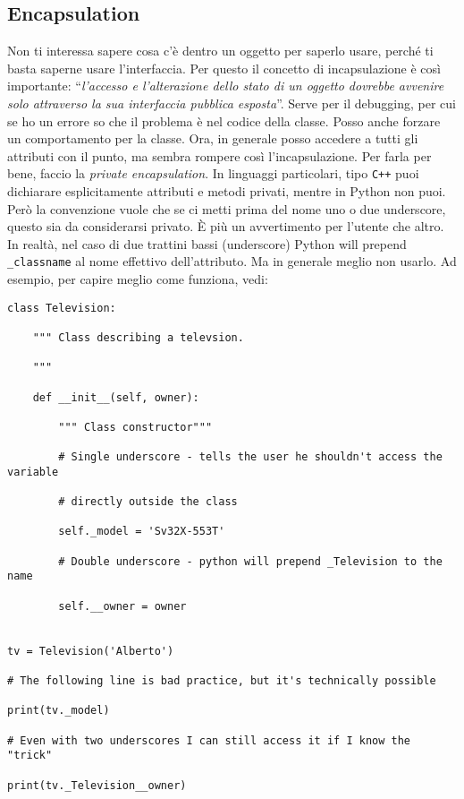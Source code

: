 \documentclass[10pt, a4paper, titlepage]{book}
\begin{document}
\subsection{Encapsulation}

Non ti interessa sapere cosa c'è dentro un oggetto per saperlo usare, perché ti basta saperne usare l'interfaccia.
Per questo il concetto di incapsulazione è così importante: ``\textit{l'accesso e l'alterazione dello stato di un oggetto dovrebbe avvenire solo attraverso la sua interfaccia pubblica esposta}''.
Serve per il debugging, per cui se ho un errore so che il problema è nel codice della classe. Posso anche forzare un comportamento per la classe.
Ora, in generale posso accedere a tutti gli attributi con il punto, ma sembra rompere così l'incapsulazione. Per farla per bene, faccio la \textit{private encapsulation}. 
In linguaggi particolari, tipo \texttt{C++} puoi dichiarare esplicitamente attributi e metodi privati, mentre in Python non puoi. Però la convenzione vuole che se ci metti prima del nome uno o due underscore, questo sia da considerarsi privato.
È più un avvertimento per l'utente che altro. In realtà, nel caso di due trattini bassi (underscore) Python will prepend \texttt{\_classname} al nome effettivo dell'attributo. Ma in generale meglio non usarlo.
Ad esempio, per capire meglio come funziona, vedi:
\begin{verbatim}
class Television:

	""" Class describing a televsion.

	"""

	def __init__(self, owner):

		""" Class constructor"""

		# Single underscore - tells the user he shouldn't access the variable

		# directly outside the class

		self._model = 'Sv32X-553T'

		# Double underscore - python will prepend _Television to the name

		self.__owner = owner


tv = Television('Alberto')

# The following line is bad practice, but it's technically possible

print(tv._model)

# Even with two underscores I can still access it if I know the "trick"

print(tv._Television__owner)
\end{verbatim}
\end{document}
